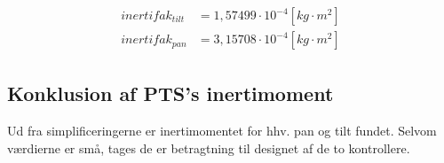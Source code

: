 \begin{align*}
\label{eq:inerti_tilt_pan_fak}
\begin{split}
{inertifak_{tilt}}&=1,57499\cdot{10}^{-4} [kg \cdot {m}^{2}]
\\
{inertifak_{pan}}&=3,15708\cdot{10}^{-4} [kg \cdot {m}^{2}]
\end{split}
\end{align*}

\subsection{Konklusion af PTS's inertimoment}
Ud fra simplificeringerne er inertimomentet for hhv. pan og tilt fundet. Selvom værdierne er små, tages de er betragtning til designet af de to kontrollere.



